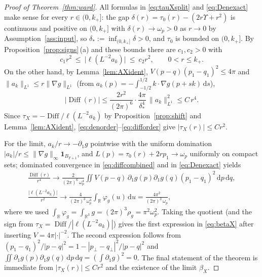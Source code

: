 \documentclass[11pt,a4paper]{amsart}
\theoremstyle{definition}
\theoremstyle{remark}
\newcommand{\R}{\mathbb{R}}
\newcommand{\dd}{\,\mathrm{d}}
\newcommand{\ellf}{\ell}
\begin{document}
\begin{proof}[Proof of Theorem~\ref{thm:ward}]
All formulas in \eqref{eq:tauXsplit} and \eqref{eq:Denexact} make sense for every $r\in(0,k_+]$: the gap $\delta(r)=\tau_0(r)-(2r\Upsilon+r^2)$ is continuous and positive on $(0,k_+]$ with $\delta(r)\to\omega_p>0$ as $r\to0$ by Assumption~\ref{ass:input}, so $\delta_*:=\inf_{(0,k_+]}\delta>0$, and $\tau_0$ is bounded on $(0,k_+]$. By Proposition~\ref{prop:signs}\,(a) and these bounds there are $c_1,c_2>0$ with
\begin{equation}\label{eq:denorder}
c_1r^2\ \le\ \bigl|\ellf(L^{-2}a_k)\bigr|\ \le\ c_2r^2,\qquad 0<r\le k_+ .
\end{equation}
On the other hand, by Lemma~\ref{lem:AXident}, $V(p-q)(p_1-q_1)^2\le4\pi$ and $\|a_k\|_{L^1}\le r\|\nabla g\|_{L^1}$ (from $a_k(p)=-\int_{-1/2}^{1/2}k\cdot\nabla g(p+sk)\dd s$),
\begin{equation}\label{eq:difforder}
|\operatorname{Diff}(r)|\le\frac{2r^2}{(2\pi)^6}\cdot\frac{4\pi}{\delta_*^4}\,\|a_k\|_{L^1}^2\le C\,r^4 .
\end{equation}
Since $\tau_X=-\operatorname{Diff}/\ellf(L^{-2}a_k)$ by Proposition~\ref{prop:shift} and Lemma~\ref{lem:AXident}, \eqref{eq:denorder}--\eqref{eq:difforder} give $|\tau_X(r)|\le Cr^2$.

For the limit, $a_k/r\to-\partial_1g$ pointwise with the uniform domination $|a_k|/r\le\|\nabla g\|_\infty\mathbf 1_{B_{\Upsilon+1}}$, and $L(p)=\tau_0(r)+2rp_1\to\omega_p$ uniformly on compact sets; dominated convergence in \eqref{eq:diffcombined} and in \eqref{eq:Denexact} yields
\begin{gather*}
\frac{\operatorname{Diff}(r)}{r^4}\longrightarrow \frac{2}{(2\pi)^6\,\omega_p^4}\iint V(p-q)\,\partial_1g(p)\partial_1g(q)(p_1-q_1)^2\dd p\dd q,\\
\frac{\bigl|\ellf(L^{-2}a_k)\bigr|}{r^2}\longrightarrow\frac{4}{(2\pi)^3\,\omega_p^{3}}\int_\R\varphi_g(u)\dd u=\frac{4\pi^2}{(2\pi)^3\,\omega_p},
\end{gather*}
where we used $\int_\R\varphi_g=\int_{\R^3}g=(2\pi)^3\rho_g=\pi^2\omega_p^2$. Taking the quotient (and the sign from $\tau_X=\operatorname{Diff}/|\ellf(L^{-2}a_k)|$) gives the first expression in \eqref{eq:betaX} after inserting $V=4\pi|\cdot|^{-2}$. The second expression follows from $(p_1-q_1)^2/|p-q|^2=1-|p_\perp-q_\perp|^2/|p-q|^2$ and $\iint\partial_1g(p)\partial_1g(q)\dd p\dd q=(\int\partial_1g)^2=0$. The final statement of the theorem is immediate from $|\tau_X(r)|\le Cr^2$ and the existence of the limit $\beta_X$.
\end{proof}
\end{document}
